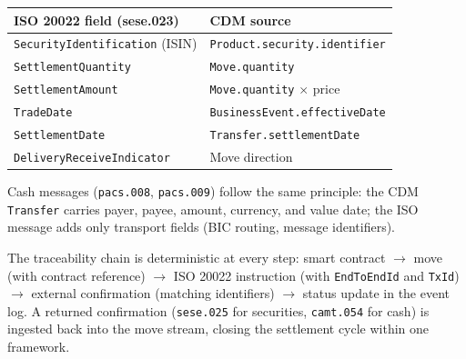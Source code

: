 \begin{center}
\begin{tabular}{l l}
\toprule
\textbf{ISO 20022 field (sese.023)} & \textbf{CDM source} \\
\midrule
\texttt{SecurityIdentification} (ISIN) & \texttt{Product.security.identifier} \\
\texttt{SettlementQuantity}            & \texttt{Move.quantity} \\
\texttt{SettlementAmount}              & \texttt{Move.quantity} $\times$ price \\
\texttt{TradeDate}                     & \texttt{BusinessEvent.effectiveDate} \\
\texttt{SettlementDate}                & \texttt{Transfer.settlementDate} \\
\texttt{DeliveryReceiveIndicator}      & Move direction \\
\bottomrule
\end{tabular}
\end{center}

Cash messages (\texttt{pacs.008}, \texttt{pacs.009}) follow the same principle: the CDM \texttt{Transfer} carries payer, payee, amount, currency, and value date; the ISO message adds only transport fields (BIC routing, message identifiers).

The traceability chain is deterministic at every step: smart contract $\to$ move (with contract reference) $\to$ ISO 20022 instruction (with \texttt{EndToEndId} and \texttt{TxId}) $\to$ external confirmation (matching identifiers) $\to$ status update in the event log. A returned confirmation (\texttt{sese.025} for securities, \texttt{camt.054} for cash) is ingested back into the move stream, closing the settlement cycle within one framework.

